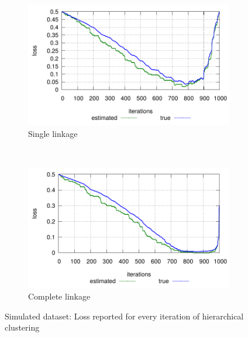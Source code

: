 \documentclass[12pt]{article}
\begin{document}
\begin{figure}[t]
    \centering
    \begin{subfigure}[t]{0.5\textwidth}
        \centering
        \includegraphics[trim=100 0 100 0, width=0.5\linewidth,valign=t]{figures/deDuplication/plot_simulated_s.pdf}
        \caption{Single linkage}
    \end{subfigure}%
    ~ 
    \begin{subfigure}[t]{0.5\textwidth}
        \centering
        \includegraphics[trim=100 0 100 0, width=0.5\linewidth,valign=t]{figures/deDuplication/plot_simulated_c.pdf}
        \caption{Complete linkage}
    \end{subfigure}
	\caption{Simulated dataset: Loss reported for every iteration of hierarchical clustering}
    \label{fig:simulated}
\end{figure}
\end{document}
